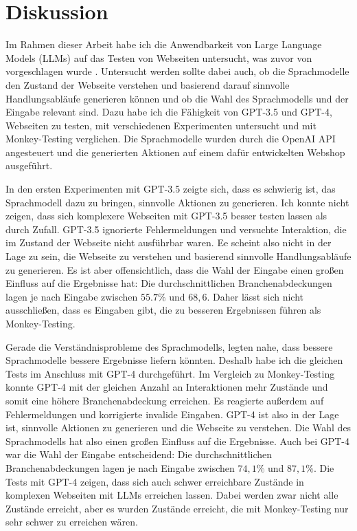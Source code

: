 
\chapter{Diskussion}
\label{ch:discussion}

Im Rahmen dieser Arbeit habe ich die Anwendbarkeit von Large Language Models (LLMs) auf das Testen von Webseiten untersucht, was zuvor von \citeauthor{GPT3Testing} vorgeschlagen wurde \cite{GPT3Testing}.
Untersucht werden sollte dabei auch, ob die Sprachmodelle den Zustand der Webseite verstehen und basierend darauf sinnvolle Handlungsabläufe generieren können und ob die Wahl des Sprachmodells und der Eingabe relevant sind.
Dazu habe ich die Fähigkeit von GPT-3.5 und GPT-4, Webseiten zu testen, mit verschiedenen Experimenten untersucht und mit Monkey-Testing verglichen.
Die Sprachmodelle wurden durch die OpenAI API angesteuert und die generierten Aktionen auf einem dafür entwickelten Webshop ausgeführt.

In den ersten Experimenten mit GPT-3.5 zeigte sich, dass es schwierig ist, das Sprachmodell dazu zu bringen, sinnvolle Aktionen zu generieren.
Ich konnte nicht zeigen, dass sich komplexere Webseiten mit GPT-3.5 besser testen lassen als durch Zufall. %
GPT-3.5 ignorierte Fehlermeldungen und versuchte Interaktion, die im Zustand der Webseite nicht ausführbar waren.
Ee scheint also nicht in der Lage zu sein, die Webseite zu verstehen und basierend sinnvolle Handlungsabläufe zu generieren. %
Es ist aber offensichtlich, dass die Wahl der Eingabe einen großen Einfluss auf die Ergebnisse hat: Die durchschnittlichen Branchenabdeckungen lagen je nach Eingabe zwischen $55{.}7\%$ und $68{,}6$. %
Daher lässt sich nicht ausschließen, dass es Eingaben gibt, die zu besseren Ergebnissen führen als Monkey-Testing.

Gerade die Verständnisprobleme des Sprachmodells, legten nahe, dass bessere Sprachmodelle bessere Ergebnisse liefern könnten.
Deshalb habe ich die gleichen Tests im Anschluss mit GPT-4 durchgeführt.
Im Vergleich zu Monkey-Testing konnte GPT-4 mit der gleichen Anzahl an Interaktionen mehr Zustände und somit eine höhere Branchenabdeckung erreichen. %
Es reagierte außerdem auf Fehlermeldungen und korrigierte invalide Eingaben.
GPT-4 ist also in der Lage ist, sinnvolle Aktionen zu generieren und die Webseite zu verstehen. %
Die Wahl des Sprachmodells hat also einen großen Einfluss auf die Ergebnisse. %
Auch bei GPT-4 war die Wahl der Eingabe entscheidend: Die durchschnittlichen Branchenabdeckungen lagen je nach Eingabe zwischen $74{,}1\%$ und $87{,}1\%$. %
Die Tests mit GPT-4 zeigen, dass sich auch schwer erreichbare Zustände in komplexen Webseiten mit LLMs erreichen lassen.
Dabei werden zwar nicht alle Zustände erreicht, aber es wurden Zustände erreicht, die mit Monkey-Testing nur sehr schwer zu erreichen wären.

